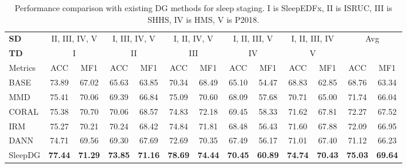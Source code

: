 \documentclass[letterpaper]{article} %
\begin{document}
	\begin{table}[tb]
		\centering
		\small
		\begin{tabular}{lcccccccccccc}
			\toprule
			\textbf{SD}& \multicolumn{2}{c}{II, III, IV, V} & \multicolumn{2}{c}{I, III, IV, V} & \multicolumn{2}{c}{I, II, IV, V} & \multicolumn{2}{c}{I, II, III, V} & \multicolumn{2}{c}{I, II, III, IV}& \multicolumn{2}{c}{\multirow{2}{*}{Avg}}\\
			\cmidrule(lr){1-1}\cmidrule(lr){2-3}\cmidrule(lr){4-5}\cmidrule(lr){6-7}\cmidrule(lr){8-9}\cmidrule(lr){10-11}
			\textbf{TD}&\multicolumn{2}{c}{I} & \multicolumn{2}{c}{II} & \multicolumn{2}{c}{III} & \multicolumn{2}{c}{IV} & \multicolumn{2}{c}{V}&&\\
			\cmidrule(lr){1-1}\cmidrule(lr){2-3}\cmidrule(lr){4-5}\cmidrule(lr){6-7}\cmidrule(lr){8-9}\cmidrule(lr){10-11}\cmidrule(lr){12-13}
			Metrics& ACC & MF1 & ACC & MF1 & ACC & MF1 & ACC & MF1 & ACC & MF1 & ACC & MF1 \\
			\midrule
			BASE&73.89&67.02&65.63&63.85&70.34&68.49&65.10&54.47&68.83&62.85&68.76&63.34\\
			MMD&75.41&70.06&69.39&66.84&75.09&70.60&68.09&57.68&70.71&65.00&71.74&66.04\\
			CORAL&75.38&70.70&70.06&68.57&74.83&72.18&69.45&58.33&71.62&67.81&72.27&67.52\\
			IRM&75.27&70.21&70.24&68.42&74.84&71.81&68.48&56.43&71.60&67.88&72.09&66.95\\
			DANN&74.71&69.56&69.30&67.69&72.69&70.35&67.49&56.17&71.01&67.40&71.12&66.23\\
			\midrule
			SleepDG&\textbf{77.44}&\textbf{71.29}&\textbf{73.85}&\textbf{71.16}&\textbf{78.69}&\textbf{74.44}&\textbf{70.45}&\textbf{60.89}&\textbf{74.74}&\textbf{70.43}&\textbf{75.03}&\textbf{69.64}\\
			\bottomrule
		\end{tabular}
		\caption{Performance comparison with existing DG methods for sleep staging. I is SleepEDFx, II is ISRUC, III is SHHS, IV is HMS, V is P2018.}	\label{tab:CompDG}
	\end{table}
\end{document}

